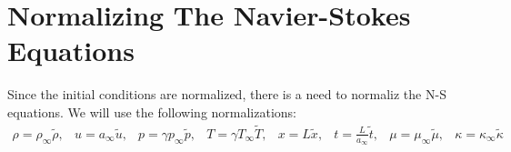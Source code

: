 \documentclass[11pt, a4paper]{article}
\begin{document}
\section{Normalizing The Navier-Stokes Equations}
Since the initial conditions are normalized, there is a need to normaliz the N-S equations. We will use the following normalizations:
\begin{equation}
    \begin{matrix}
        \rho=\rho_\infty\tilde{\rho}, & u=a_\infty\tilde{u}, & p=\gamma p_\infty\tilde{p}, & T=\gamma T_\infty\tilde{T}, & x=L\tilde{x}, & \displaystyle t=\frac{L}{a_\infty}\tilde{t}, & \mu=\mu_\infty\tilde{\mu}, & \kappa=\kappa_\infty\tilde{\kappa}
    \end{matrix}
\end{equation}
\end{document}
